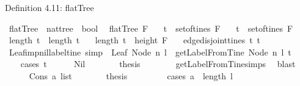 \begin{isabellebody}
\begin{isamarkuptext}%
Definition 4.11: flatTree%
\end{isamarkuptext}\isamarkuptrue%
\isamarkupfalse%
\ flatTree\ {\isacharcolon}{\isacharcolon}\ {\isachardoublequoteopen}nattree\ {\isasymRightarrow}\ bool{\isachardoublequoteclose}\ \isanewline
\ {\isachardoublequoteopen}flatTree\ F\ {\isacharequal}\ \isanewline
{\isacharparenleft}{\isasymexists}\ t{}\ {\isasymin}\ set{\isacharunderscore}of{\isacharunderscore}tines\ F{\isachardot}\ \isanewline
\ {\isasymexists}\ t{}\ {\isasymin}\ set{\isacharunderscore}of{\isacharunderscore}tines\ F{\isachardot}\ \isanewline
\ length\ t{}\ {\isacharequal}\ length\ t{}\ \isanewline
\ {\isasymand}\ length\ t{}\ {\isacharequal}\ height\ F\ \isanewline
\ {\isasymand}\ edge{\isacharunderscore}disjoint{\isacharunderscore}tines\ t{}\ t{}{\isacharparenright}{\isachardoublequoteclose}\ \ \isanewline
\isanewline
{}\isamarkupfalse%
\ Leaf{\isacharunderscore}imp{\isacharunderscore}nil{\isacharunderscore}label{\isacharunderscore}tine\ {\isacharbrackleft}simp{\isacharbrackright}{\isacharcolon}\ \ {\isachardoublequoteopen}Leaf\ {\isacharparenleft}Node\ n\ l{\isacharparenright}{\isachardoublequoteclose}\ \ {\isachardoublequoteopen}getLabelFromTine\ {\isacharparenleft}Node\ n\ l{\isacharparenright}\ t\ {\isacharequal}\ {\isacharbrackleft}{\isacharbrackright}{\isachardoublequoteclose}\ \isanewline
%
\isadelimproof
\ \ %
\endisadelimproof
%
\isatagproof
{}\isamarkupfalse%
\ {\isacharparenleft}cases\ t{\isacharparenright}\isanewline
\ \ \ \ \isamarkupfalse%
\ Nil\isanewline
\ \ \ \ \isamarkupfalse%
\ \isamarkupfalse%
\ {\isacharquery}thesis\isanewline
\ \ \ \ \ \ \isamarkupfalse%
\ getLabelFromTine{\isachardot}simps{\isacharparenleft}{}{\isacharparenright}\ \isamarkupfalse%
\ blast\ \isanewline
\ \ \isamarkupfalse%
\isanewline
\ \ \ \ \isamarkupfalse%
\ {\isacharparenleft}Cons\ a\ list{\isacharparenright}\isanewline
\ \ \ \ \isamarkupfalse%
\ \isamarkupfalse%
\ {\isacharquery}thesis\ \isanewline
\ \ \ \ \ \ \isamarkupfalse%
\ {\isacharparenleft}cases\ {\isachardoublequoteopen}a\ {\isasymge}\ length\ l{\isachardoublequoteclose}{\isacharparenright}\isanewline
\ \ \ \ \ \ \ \ \isamarkupfalse%

\end{isabellebody}
